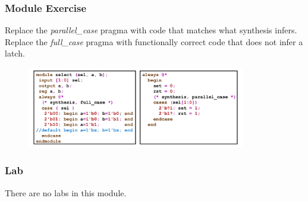 \documentclass[t, notes, xcolor=table]{beamer}
\begin{document}
\begin{frame}
\frametitle{Module Exercise}
\scriptsize{
\begin{multicols}{2}
Replace the \textit{parallel\_case} pragma with code that matches what synthesis infers.
\vfill
\columnbreak
Replace the \textit{full\_case} pragma with functionally correct code that does not infer a latch.
\end{multicols}
}
\begin{figure}
    \includegraphics[width=0.85\textwidth]{img/15_ex.png}
\end{figure}
\end{frame}

\begin{frame}
\frametitle{Lab}
There are no labs in this module.

\end{frame}
\end{document}
